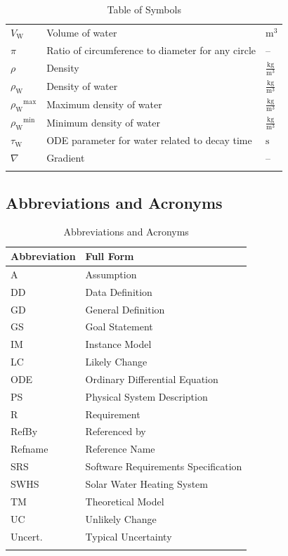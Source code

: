 \documentclass[12pt]{article}
\begin{document}
\begin{longtabu}{l X[l] l}
\\
${V_{\text{W}}}$ & Volume of water & ${\text{m}^{3}}$
\\
$π$ & Ratio of circumference to diameter for any circle & --
\\
$ρ$ & Density & $\frac{\text{kg}}{\text{m}^{3}}$
\\
${ρ_{\text{W}}}$ & Density of water & $\frac{\text{kg}}{\text{m}^{3}}$
\\
${{ρ_{\text{W}}}^{\text{max}}}$ & Maximum density of water & $\frac{\text{kg}}{\text{m}^{3}}$
\\
${{ρ_{\text{W}}}^{\text{min}}}$ & Minimum density of water & $\frac{\text{kg}}{\text{m}^{3}}$
\\
${τ_{\text{W}}}$ & ODE parameter for water related to decay time & ${\text{s}}$
\\
$∇$ & Gradient & --
\\
\bottomrule
\caption{Table of Symbols}
\label{Table:ToS}
\end{longtabu}
\subsection{Abbreviations and Acronyms}
\label{Sec:TAbbAcc}
\begin{longtable}{l l}
\toprule
\textbf{Abbreviation} & \textbf{Full Form}
\\
\midrule
\endhead
A & Assumption
\\
DD & Data Definition
\\
GD & General Definition
\\
GS & Goal Statement
\\
IM & Instance Model
\\
LC & Likely Change
\\
ODE & Ordinary Differential Equation
\\
PS & Physical System Description
\\
R & Requirement
\\
RefBy & Referenced by
\\
Refname & Reference Name
\\
SRS & Software Requirements Specification
\\
SWHS & Solar Water Heating System
\\
TM & Theoretical Model
\\
UC & Unlikely Change
\\
Uncert. & Typical Uncertainty
\\
\bottomrule
\caption{Abbreviations and Acronyms}
\label{Table:TAbbAcc}
\end{longtable}
\end{document}
